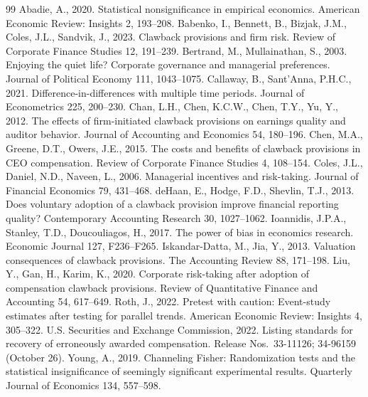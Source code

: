 \documentclass[12pt]{article}
\begin{document}
\begin{thebibliography}{99}
 Abadie, A., 2020. Statistical nonsignificance in empirical
economics. American Economic Review: Insights 2, 193--208.
 Babenko, I., Bennett, B., Bizjak, J.M., Coles, J.L.,
Sandvik, J., 2023. Clawback provisions and firm risk. Review of Corporate Finance Studies 12,
191--239.
 Bertrand, M., Mullainathan, S., 2003.
Enjoying the quiet life? Corporate governance and managerial preferences. Journal of Political
Economy 111, 1043--1075.
 Callaway, B., Sant'Anna, P.H.C., 2021.
Difference-in-differences with multiple time periods. Journal of Econometrics 225, 200--230.
 Chan, L.H., Chen, K.C.W., Chen, T.Y., Yu, Y., 2012. The
effects of firm-initiated clawback provisions on earnings quality and auditor behavior. Journal
of Accounting and Economics 54, 180--196.
 Chen, M.A., Greene, D.T., Owers, J.E., 2015. The costs and
benefits of clawback provisions in CEO compensation. Review of Corporate Finance Studies 4,
108--154.
 Coles, J.L., Daniel, N.D., Naveen, L., 2006. Managerial
incentives and risk-taking. Journal of Financial Economics 79, 431--468.
 deHaan, E., Hodge, F.D., Shevlin, T.J., 2013. Does
voluntary adoption of a clawback provision improve financial reporting quality? Contemporary
Accounting Research 30, 1027--1062.
 Ioannidis, J.P.A., Stanley, T.D., Doucouliagos, H.,
2017. The power of bias in economics research. Economic Journal 127, F236--F265.
 Iskandar-Datta, M., Jia, Y., 2013. Valuation
consequences of clawback provisions. The Accounting Review 88, 171--198.
 Liu, Y., Gan, H., Karim, K., 2020. Corporate risk-taking
after adoption of compensation clawback provisions. Review of Quantitative Finance and
Accounting 54, 617--649.
 Roth, J., 2022. Pretest with caution: Event-study estimates after
testing for parallel trends. American Economic Review: Insights 4, 305--322.
 U.S. Securities and Exchange Commission, 2022. Listing standards for
recovery of erroneously awarded compensation. Release Nos.\ 33-11126; 34-96159 (October 26).
 Young, A., 2019. Channeling Fisher: Randomization tests and the
statistical insignificance of seemingly significant experimental results. Quarterly Journal of
Economics 134, 557--598.
\end{thebibliography}
\end{document}
